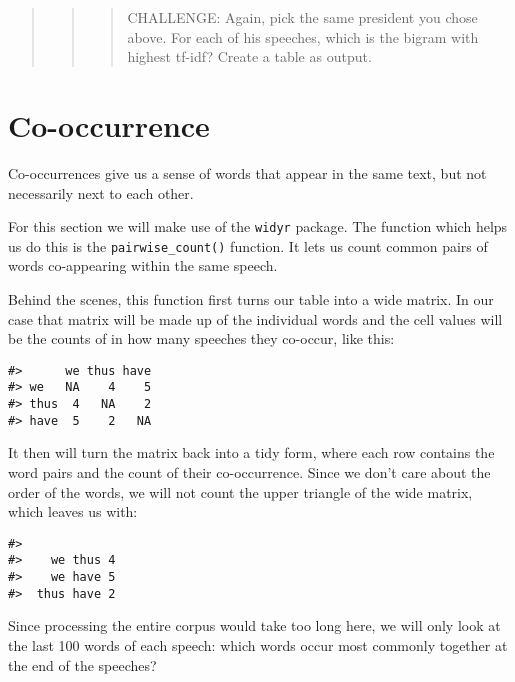 \documentclass[
]{book}
\begin{document}
\begin{quote}
\begin{quote}
\begin{quote}
CHALLENGE: Again, pick the same president you chose above. For each of his speeches, which is the bigram with highest tf-idf? Create a table as output.
\end{quote}
\end{quote}
\end{quote}

\hypertarget{co-occurrence}{%
\section{Co-occurrence}\label{co-occurrence}}

Co-occurrences give us a sense of words that appear in the same text, but not necessarily next to each other.

For this section we will make use of the \texttt{widyr} package. The function which helps us do this is the \texttt{pairwise\_count()} function. It lets us count common pairs of words co-appearing within the same speech.

Behind the scenes, this function first turns our table into a wide matrix. In our case that matrix will be made up of the individual words and the cell values will be the counts of in how many speeches they co-occur, like this:

\begin{verbatim}
#>      we thus have
#> we   NA    4    5
#> thus  4   NA    2
#> have  5    2   NA
\end{verbatim}

It then will turn the matrix back into a tidy form, where each row contains the word pairs and the count of their co-occurrence. Since we don't care about the order of the words, we will not count the upper triangle of the wide matrix, which leaves us with:

\begin{verbatim}
#>             
#>    we thus 4
#>    we have 5
#>  thus have 2
\end{verbatim}

Since processing the entire corpus would take too long here, we will only look at the last 100 words of each speech: which words occur most commonly together at the end of the speeches?
\end{document}

